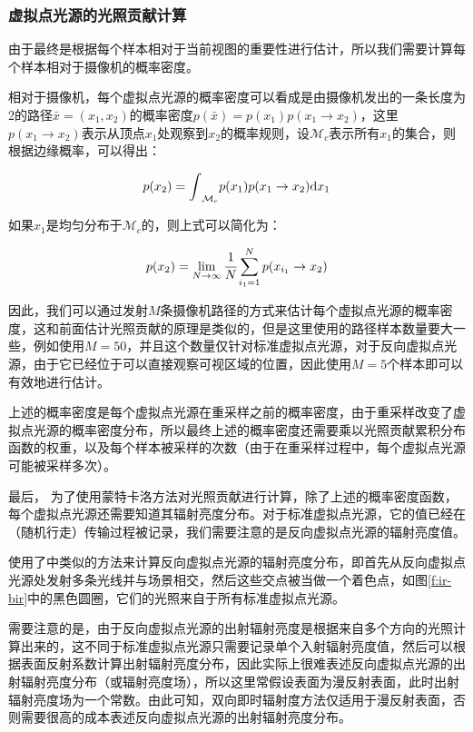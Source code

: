 \subsubsection{虚拟点光源的光照贡献计算}
由于最终是根据每个样本相对于当前视图的重要性进行估计，所以我们需要计算每个样本相对于摄像机的概率密度。

相对于摄像机，每个虚拟点光源的概率密度可以看成是由摄像机发出的一条长度为2的路径$\bar{x}=(x_1,x_2)$的概率密度$p(\bar{x})=p(x_1)p(x_1\to x_2)$，这里$p(x_1\to x_2)$表示从顶点$x_1$处观察到$x_2$的概率规则，设$\mathcal{M}_c$表示所有$x_1$的集合，则根据边缘概率，可以得出：

\begin{equation}
	p(x_2)={\rm \int}_{\mathcal{M}_c}p(x_1)p(x_1\to x_2){\rm d}x_1
\end{equation}

\noindent 如果$x_1$是均匀分布于$\mathcal{M}_c$的，则上式可以简化为：

\begin{equation}
	p(x_2)=\lim_{N\to\infty} \cfrac{1}{N}\sum^{N}_{i_1=1}p(x_{i_1}\to x_2)
\end{equation}

\noindent 因此，我们可以通过发射$M$条摄像机路径的方式来估计每个虚拟点光源的概率密度，这和前面估计光照贡献的原理是类似的，但是这里使用的路径样本数量要大一些，例如\cite{a:BidirectionalInstantRadiosity}使用$M=50$，并且这个数量仅针对标准虚拟点光源，对于反向虚拟点光源，由于它已经位于可以直接观察可视区域的位置，因此使用$M=5$个样本即可以有效地进行估计。

上述的概率密度是每个虚拟点光源在重采样之前的概率密度，由于重采样改变了虚拟点光源的概率密度分布，所以最终上述的概率密度还需要乘以光照贡献累积分布函数的权重，以及每个样本被采样的次数（由于在重采样过程中，每个虚拟点光源可能被采样多次）。

最后， 为了使用蒙特卡洛方法对光照贡献进行计算，除了上述的概率密度函数，每个虚拟点光源还需要知道其辐射亮度分布。对于标准虚拟点光源，它的值已经在（随机行走）传输过程被记录，我们需要注意的是反向虚拟点光源的辐射亮度值。

\cite{a:BidirectionalInstantRadiosity}使用了\cite{a:IlluminationinthePresenceofWeakSingularities}中类似的方法来计算反向虚拟点光源的辐射亮度分布，即首先从反向虚拟点光源处发射多条光线并与场景相交，然后这些交点被当做一个着色点，如图\ref{f:ir-bir}中的黑色圆圈，它们的光照来自于所有标准虚拟点光源。

需要注意的是，由于反向虚拟点光源的出射辐射亮度是根据来自多个方向的光照计算出来的，这不同于标准虚拟点光源只需要记录单个入射辐射亮度值，然后可以根据表面反射系数计算出射辐射亮度分布，因此实际上很难表述反向虚拟点光源的出射辐射亮度分布（或辐射亮度场），所以这里常假设表面为漫反射表面，此时出射辐射亮度场为一个常数。由此可知，双向即时辐射度方法仅适用于漫反射表面，否则需要很高的成本表述反向虚拟点光源的出射辐射亮度分布。




